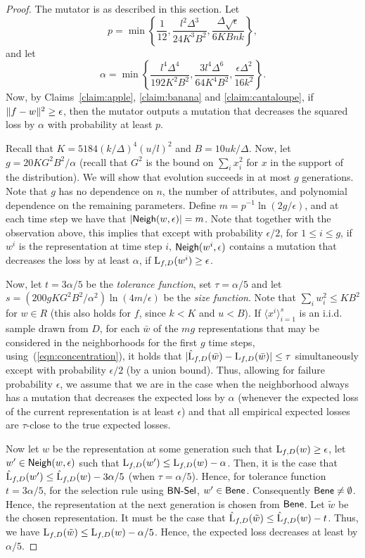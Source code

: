 \begin{proof}
The mutator is as described in this section. Let 
\[ p = \min\left\{\frac{1}{12}, \frac{l^2\Delta^3}{24K^3B^2}, \frac{\Delta
\sqrt{\epsilon}}{6KBnk}\right\},\] 
and let 
\[ \alpha = \min\left\{\frac{l^4 \Delta^4}{192 K^2B^2}, \frac{3 l^4
\Delta^6}{64K^4B^2}, \frac{\epsilon\Delta^2}{16k^2}\right\}.\] 
Now, by Claims~\ref{claim:apple}, \ref{claim:banana} and \ref{claim:cantaloupe},
if $\Vert f - w \Vert^2 \geq \epsilon$, then the mutator outputs a mutation that
decreases the squared loss by $\alpha$ with probability at least $p$.

Recall that $K = 5184 (k/\Delta)^4 (u/l)^2$ and $B = 10uk/\Delta$.  Now, let $g
= 20 K G^2 B^2/\alpha$ (recall that $G^2$ is the bound on $\sum_{i} x_i^2$ for
$x$ in the support of the distribution). We will show that evolution succeeds in
at most $g$ generations. Note that $g$ has no dependence on $n$, the number of
attributes, and polynomial dependence on the remaining parameters. Define $m =
p^{-1} \ln(2g /\epsilon)$, and at each time step we have that $|\mathsf{Neigh}(w,
\epsilon)| = m$.  Note that together with the observation above, this implies
that except with probability $\epsilon/2$, for $1 \leq i \leq g$, if $w^i$ is
the representation at time step $i$, $\mathsf{Neigh}(w^i, \epsilon)$ contains a mutation
that decreases the loss by at least $\alpha$, if $\mathrm{L}_{f, D}(w^i) \geq
\epsilon$. 

Now, let $t = 3\alpha / 5$ be the \emph{tolerance function}, set $\tau =
\alpha/5$ and let $s = (200 g KG^2B^2/\alpha^2) \ln(4m/\epsilon)$ be the
\emph{size function}. Note that $\sum_{i} w_i^2 \leq KB^2$ for $w \in R$ (this
also holds for $f$, since $k < K$ and $u < B$). If $\langle x^i \rangle_{i=1}^s$
is an i.i.d. sample drawn from $D$, for each $\bar{w}$ of the $mg$
representations that may be considered in the neighborhoods for the first $g$
time steps, using~(\ref{eqn:concentration}), it holds that $|\hat{\mathrm{L}}_{f,
D}(\bar{w}) - \mathrm{L}_{f, D}(\bar{w})| \leq \tau$ simultaneously except with
probability $\epsilon/2$ (by a union bound). Thus, allowing for failure
probability $\epsilon$, we assume that we are in the case when the neighborhood
always has a mutation that decreases the expected loss by $\alpha$ (whenever the
expected loss of the current representation is at least $\epsilon$) and that all
empirical expected losses are $\tau$-close to the true expected losses.

Now let $w$ be the representation at some generation such that $\mathrm{L}_{f, D}(w)
\geq \epsilon$, let $w^\prime \in \mathsf{Neigh}(w, \epsilon)$ such that $\mathrm{L}_{f,
D}(w^\prime) \leq \mathrm{L}_{f, D}(w) - \alpha$. Then, it is the case that
$\hat{\mathrm{L}}_{f, D}(w^\prime) \leq \hat{\mathrm{L}}_{f, D}(w) - 3\alpha/5$ (when
$\tau = \alpha/5$). Hence, for tolerance function $t = 3 \alpha/5$, for the
selection rule using $\mathsf{BN\mbox{-}Sel}$, $w^\prime \in \mathsf{Bene}$. Consequently $\mathsf{Bene} \neq
\emptyset$. Hence, the representation at the next generation is chosen from
$\mathsf{Bene}$. Let $\tilde{w}$ be the chosen representation. It must be the case that
$\hat{\mathrm{L}}_{f, D}(\tilde{w}) \leq \hat{\mathrm{L}}_{f, D}(w) - t$. Thus, we have
$\mathrm{L}_{f, D}(\tilde{w}) \leq \mathrm{L}_{f, D}(w) - \alpha/5$. Hence, the expected
loss decreases at least by $\alpha/5$.


\end{proof}

